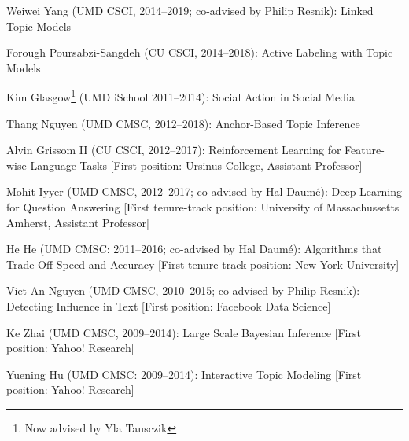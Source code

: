 {{\begin{enumerate*}
\item Weiwei Yang (UMD CSCI, 2014--2019; co-advised by Philip Resnik): Linked Topic Models
\item Forough Poursabzi-Sangdeh (CU CSCI, 2014--2018): Active Labeling with Topic Models
\item Kim Glasgow\footnote{Now advised by Yla Tausczik} (UMD iSchool 2011--2014): Social Action in Social Media
\item Thang Nguyen (UMD CMSC, 2012--2018): Anchor-Based
  Topic Inference
\item Alvin Grissom II (CU CSCI, 2012--2017):
  Reinforcement Learning for Feature-wise Language Tasks [First
  position: Ursinus College, Assistant Professor]
\item Mohit Iyyer (UMD CMSC, 2012--2017; co-advised by Hal Daum\'e): Deep Learning for Question
  Answering [First tenure-track position: University of Massachussetts Amherst,
  Assistant Professor]
\item He He (UMD CMSC: 2011--2016; co-advised by Hal Daum\'e): Algorithms that Trade-Off Speed and Accuracy [First
  tenure-track position: New York University]
\item Viet-An Nguyen (UMD CMSC, 2010--2015; co-advised by Philip Resnik): Detecting Influence in Text [First position: Facebook Data Science]
\item Ke Zhai (UMD CMSC, 2009--2014): Large Scale Bayesian Inference [First position: Yahoo! Research]
\item Yuening Hu (UMD CMSC: 2009--2014): Interactive Topic Modeling [First position: Yahoo! Research]
\end{enumerate*}

}

}
